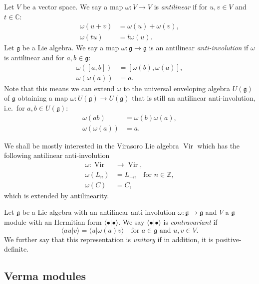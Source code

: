 \documentclass[a4paper, 12pt, reqno]{amsart}
\theoremstyle{remark}
\numberwithin{equation}{subsection}
\DeclareMathOperator{\Vir}{Vir}
\begin{document}
Let $V$ be a  vector space.
We say a map $\omega: V \to V$ is \emph{antilinear} if for $u, v \in V$ and $t \in \mathbb{C}$:
\begin{align*}
  \omega(u + v) &= \omega(u) + \omega(v), \\
  \omega(tu) &= \overline{t}\omega(u).
\end{align*}
Let $\mathfrak{g}$ be a Lie algebra.
We say a map $\omega: \mathfrak{g} \to \mathfrak{g}$ is an antilinear \emph{anti-involution} if $\omega$ is antilinear and for $a, b \in \mathfrak{g}$:
\begin{align*}
  \omega([a, b]) &= [\omega(b), \omega(a)], \\
  \omega(\omega(a)) &= a.
\end{align*}
Note that this means we can extend $\omega$ to the universal enveloping algebra $U(\mathfrak{g})$ of $\mathfrak{g}$ obtaining a map $\omega: U(\mathfrak{g}) \to U(\mathfrak{g})$ that is still an antilinear anti-involution, i.e.\ for $a, b \in U(\mathfrak{g})$:
\begin{align*}
  \omega(ab) &= \omega(b)\omega(a), \\
  \omega(\omega(a)) &= a.
\end{align*}

We shall be mostly interested in the Virasoro Lie algebra $\Vir$ which has the following antilinear anti-involution
\begin{align*}
  \omega: \Vir &\to \Vir, \\
  \omega(L_n) &= L_{-n} \quad \text{for }n \in \mathbb{Z}, \\
  \omega(C) &= C,
\end{align*}
which is extended by antilinearity.

Let $\mathfrak{g}$ be a Lie algebra with an antilinear anti-involution $\omega: \mathfrak{g} \to \mathfrak{g}$ and $V$ a $\mathfrak{g}$-module with an Hermitian form $\langle \bullet| \bullet\rangle$.
We say $\langle \bullet| \bullet\rangle$ is \emph{contravariant} if
\begin{equation*}
  \langle au| v\rangle = \langle u| \omega(a)v\rangle \quad \text{for }a \in \mathfrak{g}\text{ and }u, v \in V.
\end{equation*}
We further say that this representation is \emph{unitary} if in addition, it is positive-definite.

\subsection{Verma modules}
\label{sec:verma-modules}
\end{document}

